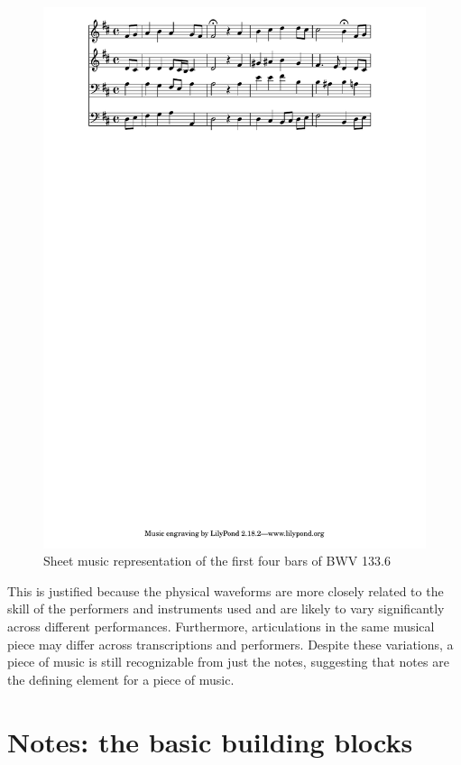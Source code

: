 \begin{figure}[tb]
    \centering
    \includegraphics[trim={0 23cm 0 0},clip,width=1.0\linewidth]{bwv133-6-eg-score.pdf}
    \caption{Sheet music representation of the first four bars of BWV 133.6}
    \label{fig:eg-score}
\end{figure}

This is justified because the physical waveforms are more closely related
to the skill of the performers and instruments used and are likely to vary
significantly across different performances. Furthermore, articulations in
the same musical piece may differ across transcriptions and performers.
Despite these variations, a piece of music is still recognizable from just the
notes, suggesting that notes are the defining element for a piece of music.

\section{Notes: the basic building blocks}


